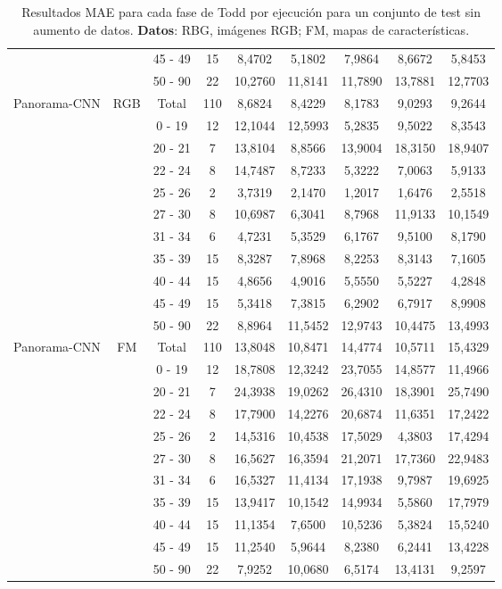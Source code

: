 \begin{table}[ht!]
{\begin{tabular}{|c|c|c|c|c|c|c|c|c|}
 &  & 45 - 49 & 15 & 8,4702 & 5,1802 & 7,9864 & 8,6672 & 5,8453 \\
 &  & 50 - 90 & 22 & 10,2760 & 11,8141 & 11,7890 & 13,7881 & 12,7703 \\ \hline
\multirow{11}{*}{Panorama-CNN} & \multirow{11}{*}{RGB} & Total & 110 & 8,6824 & 8,4229 & 8,1783 & 9,0293 & 9,2644 \\
 &  & 0 - 19 & 12 & 12,1044 & 12,5993 & 5,2835 & 9,5022 & 8,3543 \\
 &  & 20 - 21 & 7 & 13,8104 & 8,8566 & 13,9004 & 18,3150 & 18,9407 \\
 &  & 22 - 24 & 8 & 14,7487 & 8,7233 & 5,3222 & 7,0063 & 5,9133 \\
 &  & 25 - 26 & 2 & 3,7319 & 2,1470 & 1,2017 & 1,6476 & 2,5518 \\
 &  & 27 - 30 & 8 & 10,6987 & 6,3041 & 8,7968 & 11,9133 & 10,1549 \\
 &  & 31 - 34 & 6 & 4,7231 & 5,3529 & 6,1767 & 9,5100 & 8,1790 \\
 &  & 35 - 39 & 15 & 8,3287 & 7,8968 & 8,2253 & 8,3143 & 7,1605 \\
 &  & 40 - 44 & 15 & 4,8656 & 4,9016 & 5,5550 & 5,5227 & 4,2848 \\
 &  & 45 - 49 & 15 & 5,3418 & 7,3815 & 6,2902 & 6,7917 & 8,9908 \\
 &  & 50 - 90 & 22 & 8,8964 & 11,5452 & 12,9743 & 10,4475 & 13,4993 \\ \hline
\multirow{11}{*}{Panorama-CNN} & \multirow{11}{*}{FM} & Total & 110 & 13,8048 & 10,8471 & 14,4774 & 10,5711 & 15,4329 \\
 &  & 0 - 19 & 12 & 18,7808 & 12,3242 & 23,7055 & 14,8577 & 11,4966 \\
 &  & 20 - 21 & 7 & 24,3938 & 19,0262 & 26,4310 & 18,3901 & 25,7490 \\
 &  & 22 - 24 & 8 & 17,7900 & 14,2276 & 20,6874 & 11,6351 & 17,2422 \\
 &  & 25 - 26 & 2 & 14,5316 & 10,4538 & 17,5029 & 4,3803 & 17,4294 \\
 &  & 27 - 30 & 8 & 16,5627 & 16,3594 & 21,2071 & 17,7360 & 22,9483 \\
 &  & 31 - 34 & 6 & 16,5327 & 11,4134 & 17,1938 & 9,7987 & 19,6925 \\
 &  & 35 - 39 & 15 & 13,9417 & 10,1542 & 14,9934 & 5,5860 & 17,7979 \\
 &  & 40 - 44 & 15 & 11,1354 & 7,6500 & 10,5236 & 5,3824 & 15,5240 \\
 &  & 45 - 49 & 15 & 11,2540 & 5,9644 & 8,2380 & 6,2441 & 13,4228 \\
 &  & 50 - 90 & 22 & 7,9252 & 10,0680 & 6,5174 & 13,4131 & 9,2597 \\ \hline
\end{tabular}%
}
\caption[Resultados MAE para cada fase de Todd por ejecución para un conjunto de test sin aumento de datos.]{Resultados MAE para cada fase de Todd por ejecución para un conjunto de test sin aumento de datos. \textbf{Datos}: RBG, imágenes RGB; FM, mapas de características.}
\label{tab:rtodd_s_mae}
\end{table}

